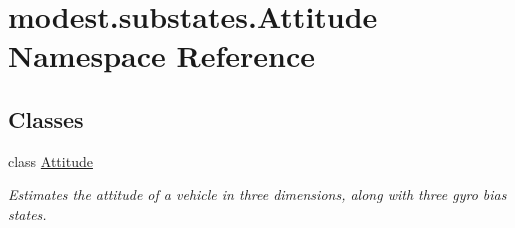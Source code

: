 \hypertarget{namespacemodest_1_1substates_1_1Attitude}{}\section{modest.\+substates.\+Attitude Namespace Reference}
\label{namespacemodest_1_1substates_1_1Attitude}
\subsection*{Classes}
\begin{DoxyCompactItemize}
\item 
class \hyperlink{classmodest_1_1substates_1_1Attitude_1_1Attitude}{Attitude}
\begin{DoxyCompactList}\small\item\em Estimates the attitude of a vehicle in three dimensions, along with three gyro bias states. \end{DoxyCompactList}\end{DoxyCompactItemize}
